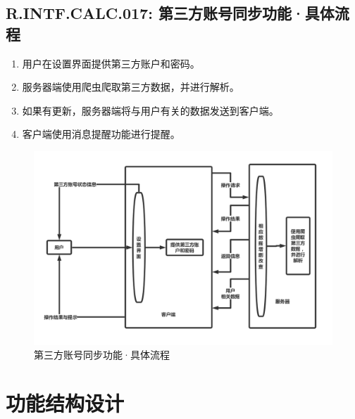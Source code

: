         {
        \color{red}
        \subsection{\color{red}R.INTF.CALC.017: 第三方账号同步功能·具体流程}
            \begin{enumerate}
                \item 用户在设置界面提供第三方账户和密码。
                \item 服务器端使用爬虫爬取第三方数据，并进行解析。
                \item 如果有更新，服务器端将与用户有关的数据发送到客户端。
                \item 客户端使用消息提醒功能进行提醒。
            \end{enumerate}
        }
        \begin{figure}[h]
            \centering
            \includegraphics[scale=0.35]{OutlineDesign/figures/第三方账号同步功能·具体流程.png}
            \caption{\color{red}第三方账号同步功能·具体流程}
            \label{fig:server_flow}
        \end{figure}
        \newpage
\section{\color{red} 功能结构设计}
